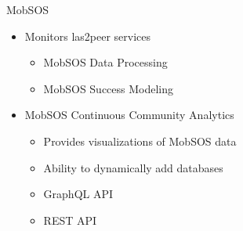 \begin{frame}{MobSOS}

  \begin{itemize}
    \item Monitors las2peer services \cite{Renz16}
    \begin{itemize}
        \item MobSOS Data Processing
        \item MobSOS Success Modeling
    \end{itemize}
    \item MobSOS Continuous Community Analytics \cite{Kers20} 
          \begin{itemize}
            \item Provides visualizations of MobSOS data
            \item Ability to dynamically add databases
            \item GraphQL API
            \item REST API
          \end{itemize}
  \end{itemize}
\end{frame}



